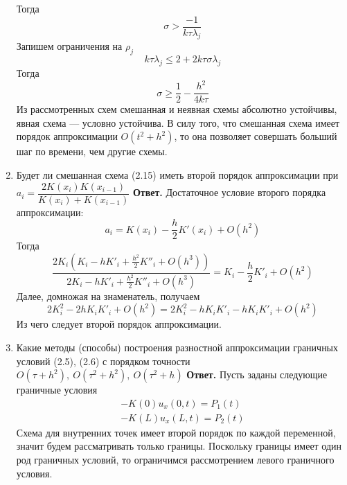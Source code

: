 \documentclass{article}
\begin{document}
\begin{enumerate}
		Тогда 
		\begin{equation*}
			\sigma > \frac{-1}{k \tau \lambda_j}
		\end{equation*}
		Запишем ограничения на $\rho_j$
		\begin{equation*}
			k \tau \lambda_j \leqslant 2 + 2 k \tau \sigma \lambda_j
		\end{equation*}		
		Тогда 
		\begin{equation*}
			\sigma \geqslant \frac{1}{2} - \frac{h^2}{4k\tau}
		\end{equation*}
		Из рассмотренных схем смешанная и неявная схемы абсолютно устойчивы, явная схема ---
		условно устойчива. 
		В силу того, что смешанная схема имеет порядок аппроксимации $O(t^2 + h^2)$, то она 
		позволяет совершать больший шаг по времени, чем другие схемы.
		\item Будет ли смешанная схема (2.15) иметь второй порядок
		аппроксимации при $a_i = \dfrac{2 K(x_i) K(x_{i-1})}{K(x_i) + K(x_{i-1})}$
		\newline
		{\bfseries Ответ. } 
		Достаточное условие второго порядка аппроксимации:
		\begin{equation*}
			a_i = K(x_i) - \frac{h}{2}K'(x_i) + O(h^2)
		\end{equation*}
		Тогда 
		\begin{equation*}
			\frac{2K_i(K_i - h K'_i + \frac{h^2}{2}K''_i + O(h^3))}{2K_i - h K'_i + \frac{h^2}{2} K''_i + O(h^3)}=
			K_i - \frac{h}{2}K'_i + O(h^2)
		\end{equation*}
		Далее, домножая на знаменатель, получаем 
		\begin{equation*}
			2 K^2_i - 2 h K_i K'_i  + O(h^2) = 2 K^2_i - h K_i K'_i - h K_i K'_i + O(h^2)
		\end{equation*}
		Из чего следует второй порядок аппроксимации.
		\item Какие методы (способы) построения разностной аппроксимации граничных условий 
		(2.5), (2.6) с порядком точности $O(\tau + h^2), \ O(\tau^2 + h^2), \ O(\tau^2 + h)$
		\newline
		{\bfseries Ответ. } 
		Пусть заданы следующие граничные условия 
		\begin{gather*}
			- K(0) u_x (0, t) = P_1(t) \\ 
			-K(L) u_x (L, t) = P_2(t) 
		\end{gather*}
		Схема для внутренних точек имеет второй порядок по каждой переменной, значит
		будем рассматривать только границы. Поскольку границы имеет один род 
		граничных условий, то ограничимся рассмотрением левого граничного условия. 


\end{enumerate}
\end{document}
